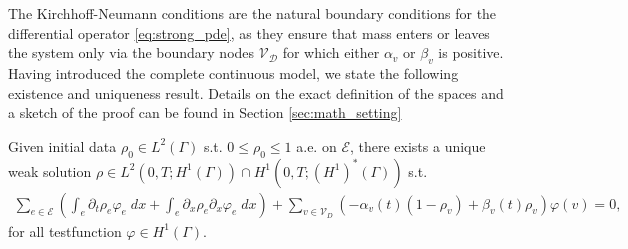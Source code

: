 The Kirchhoff-Neumann conditions are the natural boundary conditions for the differential operator \eqref{eq:strong_pde}, as they ensure that mass enters or leaves the system only via the boundary nodes $\mathcal{V}_\mathcal{D}$ for which either $\alpha_v$ or $\beta_v$ is positive. 
%
Having introduced the complete continuous model, we state the following existence and uniqueness result. Details on the exact definition of the spaces and a sketch of the proof can be found in Section \ref{sec:math_setting}
\begin{theorem} Given initial data $\rho_0 \in L^2(\Gamma)$ s.t. $0 \le \rho_0 \le 1$ a.e. on $\mathcal{E}$, there exists a unique weak solution $\rho \in L^2(0,T; H^1(\Gamma)) \cap H^1(0,T; (H^1)^*(\Gamma))$ s.t.
	\begin{align*}
		\sum_{e \in \mathcal{E}} \left(\int_e  \partial_t \rho_e \varphi_e \;dx + \int_e \partial_x \rho_e\partial_x \varphi_e \;dx\right) + \sum_{v \in \mathcal{V}_D} (-\alpha_v(t) (1-\rho_v) + \beta_v(t) \rho_v)\varphi(v) = 0,
	\end{align*}
	for all testfunction $\varphi \in H^1(\Gamma)$.
\end{theorem}

